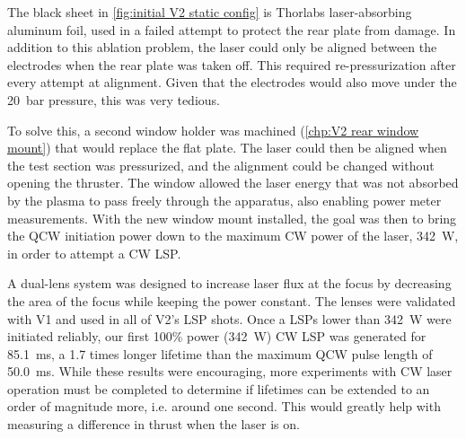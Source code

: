The black sheet in \autoref{fig:initial V2 static config} is Thorlabs laser-absorbing aluminum foil, used in a failed attempt to protect the rear plate from damage. In addition to this ablation problem, the laser could only be aligned between the electrodes when the rear plate was taken off. This required re-pressurization after every attempt at alignment. Given that the electrodes would also move under the \qty{20}{bar} pressure, this was very tedious. 

To solve this, a second window holder was machined (\autoref{chp:V2 rear window mount}) that would replace the flat plate. The laser could then be aligned when the test section was pressurized, and the alignment could be changed without opening the thruster. The window allowed the laser energy that was not absorbed by the plasma to pass freely through the apparatus, also enabling power meter measurements. With the new window mount installed, the goal was then to bring the QCW initiation power down to the maximum CW power of the laser, \qty{342}{W}, in order to attempt a CW LSP.

A dual-lens system was designed to increase laser flux at the focus by decreasing the area of the focus while keeping the power constant. The lenses were validated with V1 and used in all of V2's LSP shots. Once a LSPs lower than \qty{342}{W} were initiated reliably, our first 100\% power (\qty{342}{W}) CW LSP was generated for \qty{85.1}{ms}, a 1.7 times longer lifetime than the maximum QCW pulse length of \qty{50.0}{ms}. While these results were encouraging, more experiments with CW laser operation must be completed to determine if lifetimes can be extended to an order of magnitude more, i.e. around one second. This would greatly help with measuring a difference in thrust when the laser is on.

